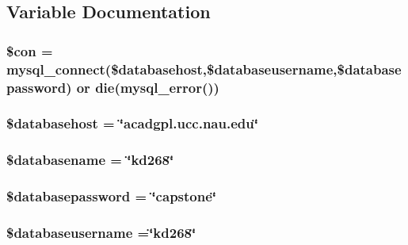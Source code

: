 \subsection{Variable Documentation}
\hypertarget{_p_h_p_query_8php_a0debe10448ec56a57b5509648408a549}{
\subsubsection[{\$con}]{\setlength{\rightskip}{0pt plus 5cm}\$con = mysql\-\_\-connect(\$databasehost,\$databaseusername,\$databasepassword) or die(mysql\-\_\-error())}}\label{_p_h_p_query_8php_a0debe10448ec56a57b5509648408a549}
\hypertarget{_p_h_p_query_8php_a034ead57b6864a4413371711e8d65372}{
\subsubsection[{\$databasehost}]{\setlength{\rightskip}{0pt plus 5cm}\$databasehost = \char`\"{}acadgpl.\-ucc.\-nau.\-edu\char`\"{}}}\label{_p_h_p_query_8php_a034ead57b6864a4413371711e8d65372}
\hypertarget{_p_h_p_query_8php_aace53f8afce81b52040cef0cd850138a}{
\subsubsection[{\$databasename}]{\setlength{\rightskip}{0pt plus 5cm}\$databasename = \char`\"{}kd268\char`\"{}}}\label{_p_h_p_query_8php_aace53f8afce81b52040cef0cd850138a}
\hypertarget{_p_h_p_query_8php_a1a07536b6a5f43f2d8f826bd2ee6c91a}{
\subsubsection[{\$databasepassword}]{\setlength{\rightskip}{0pt plus 5cm}\$databasepassword = \char`\"{}capstone\char`\"{}}}\label{_p_h_p_query_8php_a1a07536b6a5f43f2d8f826bd2ee6c91a}
\hypertarget{_p_h_p_query_8php_a251bf75f510d7c8b556c65d7c30e911f}{
\subsubsection[{\$databaseusername}]{\setlength{\rightskip}{0pt plus 5cm}\$databaseusername =\char`\"{}kd268\char`\"{}}}\label{_p_h_p_query_8php_a251bf75f510d7c8b556c65d7c30e911f}
